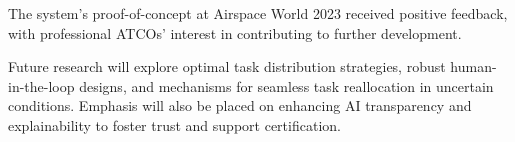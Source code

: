 

The system's proof-of-concept at Airspace World 2023 received positive feedback, with professional \glspl{ATCO}' interest in contributing to further development.

Future research will explore optimal task distribution strategies, robust human-in-the-loop designs, and mechanisms for seamless task reallocation in uncertain conditions.
Emphasis will also be placed on enhancing \gls{AI} transparency and explainability to foster trust and support certification.

